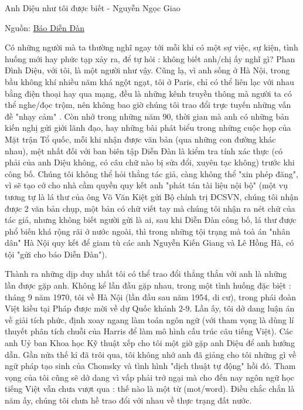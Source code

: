 Anh Diệu như tôi được biết - Nguyễn Ngọc Giao

Nguồn: \href{https://www.diendan.org/nhung-con-nguoi/anh-dieu-nhu-toi-duoc-biet}{Báo Diễn Đàn}

Có những người mà ta thường nghĩ ngay tới mỗi khi có một sự việc, sự kiện, tình huống mới hay phức tạp xảy ra, để tự hỏi : không biết anh/chị ấy nghĩ gì? Phan Đình Diệu, với tôi, là một người như vậy. Cũng lạ, vì anh sống ở Hà Nội, trong bầu không khí nhiều năm khá ngột ngạt, tôi ở Paris, chỉ có thể liên lạc với nhau bằng điện thoại hay qua mạng, đều là những kênh truyền thông mà người ta có thể nghe/đọc trộm, nên không bao giờ chúng tôi trao đổi trực tuyến những vấn đề "nhạy cảm" . Còn nhớ trong những năm 90, thời gian mà anh có những bản kiến nghị gửi giới lãnh đạo, hay những bài phát biểu trong những cuộc họp của Mặt trận Tổ quốc, mỗi khi nhận được văn bản (qua những con đường khác nhau), mệt nhất đối với ban biên tập Diễn Đàn là kiểm tra tính xác thực (có phải của anh Diệu không, có câu chữ nào bị sửa đổi, xuyên tạc không) trước khi công bố. Chúng tôi không thể hỏi thẳng tác giả, càng không thể "xin phép đăng", vì sẽ tạo cớ cho nhà cầm quyền quy kết anh "phát tán tài liệu nội bộ" (một vụ tương tự là lá thư của ông Võ Văn Kiệt gửi Bộ chính trị ĐCSVN, chúng tôi nhận được 2 văn bản chụp, một bản có chữ viết tay mà chúng tôi nhận ra nét chữ của tác giả, nhưng không biết người gửi là ai, sau khi Diễn Đàn công bố, lá thư được phổ biến khá rộng rãi ở nước ngoài, thì trong những tội trạng mà toà án "nhân dân" Hà Nội quy kết để giam tù các anh Nguyễn Kiến Giang và Lê Hồng Hà, có tội "gửi cho báo Diễn Đàn").

Thành ra những dịp duy nhất tôi có thể trao đổi thẳng thắn với anh là những lần được gặp anh. Không kể lần đầu gặp nhau, trong một tình huống đặc biệt : tháng 9 năm 1970, tôi về Hà Nội (lần đầu sau năm 1954, di cư), trong phái đoàn Việt kiều tại Pháp được mời về dự Quốc khánh 2-9. Lần ấy, tôi dở dang luận án về giải tích phức, định xoay ngang làm toán ngôn ngữ (với tham vọng là dùng lí thuyết phân tích chuỗi của Harris để làm mô hình cấu trúc câu tiếng Việt). Các anh Uỷ ban Khoa học Kỹ thuật xếp cho tôi một giờ gặp anh Diệu để anh hướng dẫn. Gần nửa thế kỉ đã trôi qua, tôi không nhớ anh đã giảng cho tôi những gì về ngữ pháp tạo sinh của Chomsky và tình hình "dịch thuật tự động" hồi đó. Tham vọng của tôi cũng sẽ dở dang vì vấp phải trở ngại mà cho đến nay ngôn ngữ học tiếng Việt vẫn chưa vượt qua : thế nào là một từ (mot/word). Điều chắc chắn là năm ấy, chúng tôi chưa hề trao đổi với nhau về thực trạng đất nước.


